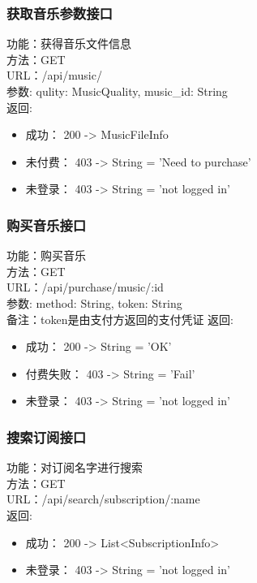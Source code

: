 \subsubsection{获取音乐参数接口}

\noindent
功能：获得音乐文件信息\\
方法：GET\\
URL：/api/music/\\
参数: qulity: MusicQuality, music\_id: String\\
返回:
\begin{itemize}
	\item 成功： 200 -> MusicFileInfo
	\item 未付费： 403 -> String = 'Need to purchase'
	\item 未登录： 403 -> String = 'not logged in'
\end{itemize}

\subsubsection{购买音乐接口}

\noindent
功能：购买音乐\\
方法：GET\\
URL：/api/purchase/music/:id\\
参数: method: String, token: String\\
备注：token是由支付方返回的支付凭证
返回:
\begin{itemize}
	\item 成功： 200 -> String = 'OK'
	\item 付费失败： 403 -> String = 'Fail'
	\item 未登录： 403 -> String = 'not logged in'
\end{itemize}


\subsubsection{搜索订阅接口}

\noindent
功能：对订阅名字进行搜索\\
方法：GET\\
URL：/api/search/subscription/:name\\
返回:
\begin{itemize}
	\item 成功： 200 -> List<SubscriptionInfo>
	\item 未登录： 403 -> String = 'not logged in'
\end{itemize}

